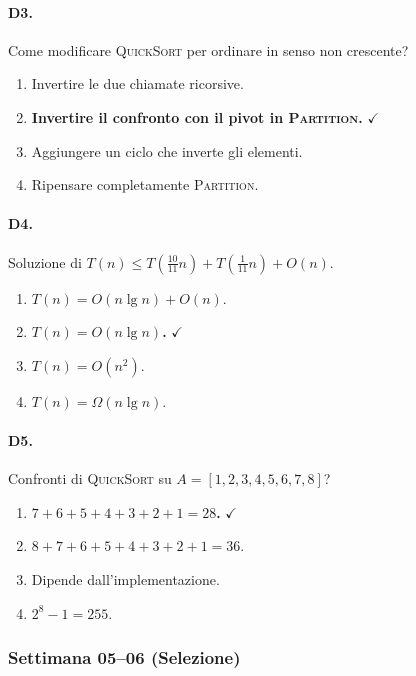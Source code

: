 \paragraph{D3.} Come modificare \textsc{QuickSort} per ordinare in senso non crescente?
\begin{enumerate}[label=\Alph*.,leftmargin=*]
	\item Invertire le due chiamate ricorsive.
	\item \textcolor{correctgreen}{\textbf{Invertire il confronto con il pivot in \textsc{Partition}.}} \hfill\textcolor{correctgreen}{$\checkmark$}
	\item Aggiungere un ciclo che inverte gli elementi.
	\item Ripensare completamente \textsc{Partition}.
\end{enumerate}

\paragraph{D4.} Soluzione di $T(n) \leq T\!\left(\tfrac{10}{11}n\right) + T\!\left(\tfrac{1}{11}n\right) + O(n)$.
\begin{enumerate}[label=\Alph*.,leftmargin=*]
	\item $T(n) = O(n\lg n) + O(n)$.
	\item \textcolor{correctgreen}{\textbf{$T(n) = O(n\lg n)$.}} \hfill\textcolor{correctgreen}{$\checkmark$}
	\item $T(n) = O(n^2)$.
	\item $T(n) = \Omega(n\lg n)$.
\end{enumerate}

\paragraph{D5.} Confronti di \textsc{QuickSort} su $A=[1,2,3,4,5,6,7,8]$?
\begin{enumerate}[label=\Alph*.,leftmargin=*]
	\item \textcolor{correctgreen}{\textbf{$7+6+5+4+3+2+1 = 28$.}} \hfill\textcolor{correctgreen}{$\checkmark$}
	\item $8+7+6+5+4+3+2+1 = 36$.
	\item Dipende dall'implementazione.
	\item $2^8 - 1 = 255$.
\end{enumerate}

\subsubsection{Settimana 05--06 (Selezione)}

